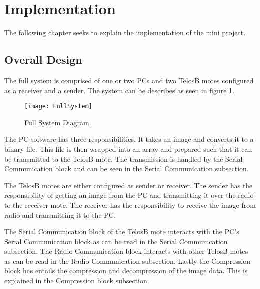 \section{Implementation}
The following chapter seeks to explain the implementation of the mini project.

\subsection{Overall Design}
The full system is comprised of one or two PCs and two TelosB motes configured as a receiver and a sender. The system can be describes as seen in figure \ref{FullSystem}. 
\begin{figure}[H]
	\centering
	\texttt{[image: FullSystem]}
	\caption{Full System Diagram.}
	\label{FullSystem}
\end{figure}
The PC software has three responsibilities. It takes an image and converts it to a binary file. This file is then wrapped into an array and prepared such that it can be transmitted to the TelosB mote. The transmission is handled by the Serial Communication block and can be seen in the Serial Communication subsection.

The TelosB motes are either configured as sender or receiver.  The sender has the responsibility of getting an image from the PC and transmitting it over the radio to the receiver mote. The receiver has the responsibility to receive the image from radio and transmitting it to the PC.

The Serial Communication block of the TelosB mote interacts with the PC's Serial Communication block as can be read in the Serial Communication subsection. The Radio Communication block interacts with other TelosB motes as can be read in the Radio Communication subsection. Lastly the Compression block has entails the compression and decompression of the image data. This is explained in the Compression block subsection.

